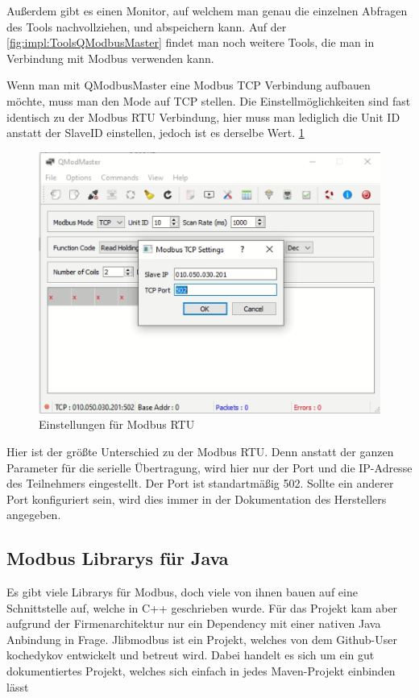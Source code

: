 Außerdem gibt es einen Monitor, auf welchem man genau die einzelnen Abfragen des Tools nachvollziehen, und abspeichern kann. Auf der \ref{fig:impl:ToolsQModbusMaster} findet man noch weitere Tools, die man in Verbindung mit Modbus verwenden kann.  


Wenn man mit QModbusMaster eine Modbus TCP Verbindung aufbauen möchte, muss man den Mode auf TCP stellen. Die Einstellmöglichkeiten sind fast identisch zu der Modbus RTU Verbindung, hier muss man lediglich die Unit ID anstatt der SlaveID einstellen, jedoch ist es derselbe Wert. \ref{fig:impl:QmodbusMasterTCP}

\begin{figure}[h t] 
    \centering
    \includegraphics[scale=0.7]{pics/QmodbusMasterTCP setting.png}
    \caption{Einstellungen für Modbus RTU}
    \label{fig:impl:QmodbusMasterTCP}
\end{figure}

Hier ist der größte Unterschied zu der Modbus RTU. Denn anstatt der ganzen Parameter für die serielle Übertragung, wird hier nur der Port und die IP-Adresse des Teilnehmers eingestellt. Der Port ist standartmäßig 502. Sollte ein anderer Port konfiguriert sein, wird dies immer in der Dokumentation des Herstellers angegeben. 

 \subsection{Modbus Librarys für Java }

 Es gibt viele Librarys für Modbus, doch viele von ihnen bauen auf eine Schnittstelle auf, welche in C++ geschrieben wurde. Für das Projekt kam aber aufgrund der Firmenarchitektur nur ein Dependency mit einer nativen Java Anbindung in Frage. Jlibmodbus ist ein Projekt, welches von dem Github-User kochedykov entwickelt und betreut wird. Dabei handelt es sich um ein gut dokumentiertes Projekt, welches sich einfach in jedes Maven-Projekt einbinden lässt 


